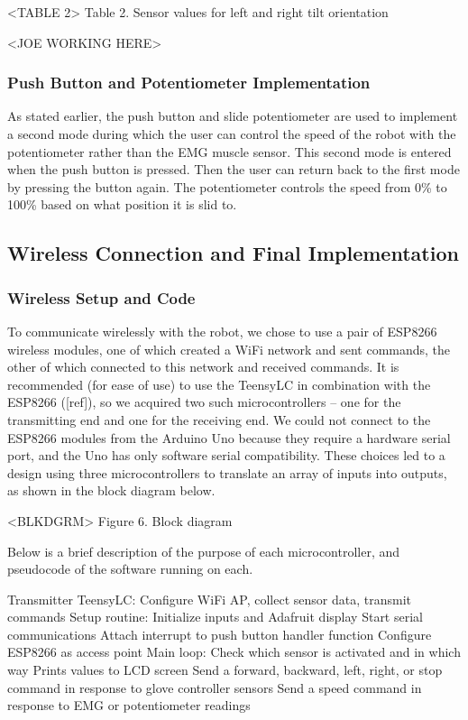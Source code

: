 \documentclass[12pt,scrartcl,titlepage]{article}
\begin{document}
  <TABLE 2> Table 2. Sensor values for left and right tilt orientation

<JOE WORKING HERE>
  
  \subsubsection{Push Button and Potentiometer Implementation}

  As stated earlier, the push button and slide potentiometer are used to implement a second mode during which the user can control the speed of the robot with the potentiometer rather than the EMG muscle sensor. This second mode is entered when the push button is pressed. Then the user can return back to the first mode by pressing the button again. The potentiometer controls the speed from 0\% to 100\% based on what position it is slid to.
  
  \subsection{Wireless Connection and Final Implementation}

  \subsubsection{Wireless Setup and Code}

  To communicate wirelessly with the robot, we chose to use a pair of ESP8266 wireless modules, one of which created a WiFi network and sent commands, the other of which connected to this network and received commands. It is recommended (for ease of use) to use the TeensyLC in combination with the ESP8266 ([ref]), so we acquired two such microcontrollers – one for the transmitting end and one for the receiving end. We could not connect to the ESP8266 modules from the Arduino Uno because they require a hardware serial port, and the Uno has only software serial compatibility. These choices led to a design using three microcontrollers to translate an array of inputs into outputs, as shown in the block diagram below.

  <BLKDGRM> Figure 6. Block diagram

  Below is a brief description of the purpose of each microcontroller, and pseudocode of the software running on each.

  Transmitter TeensyLC: Configure WiFi AP, collect sensor data, transmit commands
Setup routine:
Initialize inputs and Adafruit display
Start serial communications
Attach interrupt to push button handler function
Configure ESP8266 as access point
Main loop:
Check which sensor is activated and in which way
Prints values to LCD screen
Send a forward, backward, left, right, or stop command in response to glove controller sensors
Send a speed command in response to EMG or potentiometer readings
\end{document}

